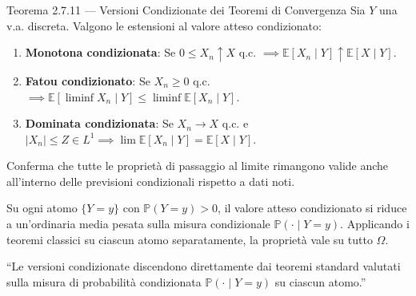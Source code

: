 \documentclass[11pt,a4paper]{report}
\begin{document}
\begin{teoremabox}{Teorema 2.7.11 --- Versioni Condizionate dei Teoremi di Convergenza}
Sia $Y$ una v.a. discreta. Valgono le estensioni al valore atteso condizionato:
\begin{enumerate}
    \item \textbf{Monotona condizionata}: Se $0 \le X_n \uparrow X$ q.c. $\implies \mathbb{E}[X_n \mid Y] \uparrow \mathbb{E}[X \mid Y]$.
    \item \textbf{Fatou condizionato}: Se $X_n \ge 0$ q.c. $\implies \mathbb{E}[\liminf X_n \mid Y] \le \liminf \mathbb{E}[X_n \mid Y]$.
    \item \textbf{Dominata condizionata}: Se $X_n \to X$ q.c. e $|X_n| \le Z \in L^1 \implies \lim \mathbb{E}[X_n \mid Y] = \mathbb{E}[X \mid Y]$.
\end{enumerate}

\begin{cosafa}
Conferma che tutte le proprietà di passaggio al limite rimangono valide anche all'interno delle previsioni condizionali rispetto a dati noti.
\end{cosafa}

\begin{dimostrazione}
Su ogni atomo $\{Y = y\}$ con $\mathbb{P}(Y=y) > 0$, il valore atteso condizionato si riduce a un'ordinaria media pesata sulla misura condizionale $\mathbb{P}(\cdot \mid Y=y)$. Applicando i teoremi classici su ciascun atomo separatamente, la proprietà vale su tutto $\Omega$.
\end{dimostrazione}

\begin{oralbox}
``Le versioni condizionate discendono direttamente dai teoremi standard valutati sulla misura di probabilità condizionata $\mathbb{P}(\cdot \mid Y=y)$ su ciascun atomo.''
\end{oralbox}
\end{teoremabox}

\newpage
\end{document}
